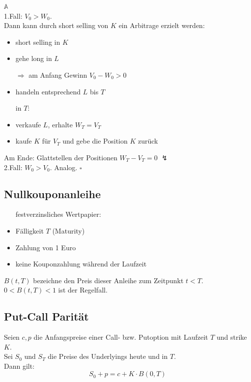 \underline{$\mathds{A}$} \\
1.Fall: $V_0>W_0$. \\
Dann kann durch short selling von $K$ ein Arbitrage erzielt werden:
\begin{itemize}
	\item short selling in $K$
	\item gehe long in $L$
	\item[$\Rightarrow$ am Anfang Gewinn $V_0-W_0>0$]
	\item handeln entsprechend $L$ bis $T$
	\item[in $T$:]
	\item verkaufe $L$, erhalte $W_T = V_T$ 
	\item kaufe $K$ für $V_T$ und gebe die Position $K$ zurück
\end{itemize}
Am Ende: Glattstellen der Positionen $W_T - V_T = 0$ \textbf{$\lightning$} \\

2.Fall: $W_0>V_0$. Analog.
\hfill $\square$


\subsection{Nullkouponanleihe}
\label{sub: nullkouponanleihe}
\begin{itemize}
	\item[festverzinsliches Wertpapier:]
	\item Fälligkeit $T$ (Maturity)
	\item Zahlung von 1 Euro
	\item keine Kouponzahlung während der Laufzeit
\end{itemize}
$B(t,T)$ bezeichne den Preis dieser Anleihe zum Zeitpunkt $t<T$. $0<B(t,T)<1$ ist der Regelfall.


\subsection{Put-Call Parität}
\label{sub: put-call_parität}
Seien $c,p$ die Anfangspreise einer Call- bzw. Putoption mit Laufzeit $T$ und strike $K$.\\
Sei $S_0$ und $S_T$ die Preise des Underlyings heute und in $T$. \\
Dann gilt: 
\[
	S_0 + p = c + K\cdot B(0,T)
\]

